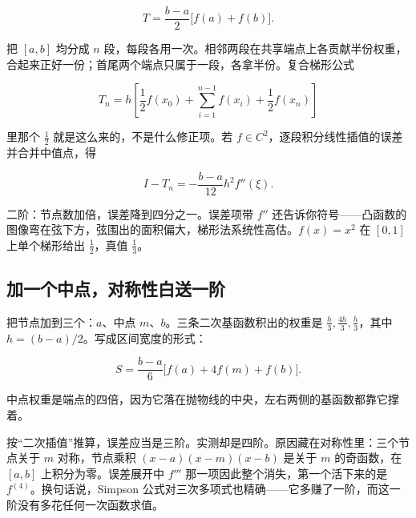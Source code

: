 \[
T=\frac{b-a}{2}\bigl[f(a)+f(b)\bigr].
\]

把 \([a,b]\) 均分成 \(n\) 段，每段各用一次。相邻两段在共享端点上各贡献半份权重，合起来正好一份；首尾两个端点只属于一段，各拿半份。复合梯形公式

\[
T_n=h\left[\frac12f(x_0)+\sum_{i=1}^{n-1}f(x_i)+\frac12f(x_n)\right]
\]

里那个 \(\tfrac12\) 就是这么来的，不是什么修正项。若 \(f\in C^2\)，逐段积分线性插值的误差并合并中值点，得

\[
I-T_n=-\frac{b-a}{12}h^2f''(\xi).
\]

二阶：节点数加倍，误差降到四分之一。误差项带 \(f''\) 还告诉你符号——凸函数的图像弯在弦下方，弦围出的面积偏大，梯形法系统性高估。\(f(x)=x^2\) 在 \([0,1]\) 上单个梯形给出 \(\tfrac12\)，真值 \(\tfrac13\)。

\subsection{加一个中点，对称性白送一阶}

把节点加到三个：\(a\)、中点 \(m\)、\(b\)。三条二次基函数积出的权重是 \(\tfrac{h}{3},\tfrac{4h}{3},\tfrac{h}{3}\)，其中 \(h=(b-a)/2\)。写成区间宽度的形式：

\[
S=\frac{b-a}{6}\bigl[f(a)+4f(m)+f(b)\bigr].
\]

中点权重是端点的四倍，因为它落在抛物线的中央，左右两侧的基函数都靠它撑着。

按``二次插值''推算，误差应当是三阶。实测却是四阶。原因藏在对称性里：三个节点关于 \(m\) 对称，节点乘积 \((x-a)(x-m)(x-b)\) 是关于 \(m\) 的奇函数，在 \([a,b]\) 上积分为零。误差展开中 \(f'''\) 那一项因此整个消失，第一个活下来的是 \(f^{(4)}\)。换句话说，Simpson 公式对三次多项式也精确——它多赚了一阶，而这一阶没有多花任何一次函数求值。

